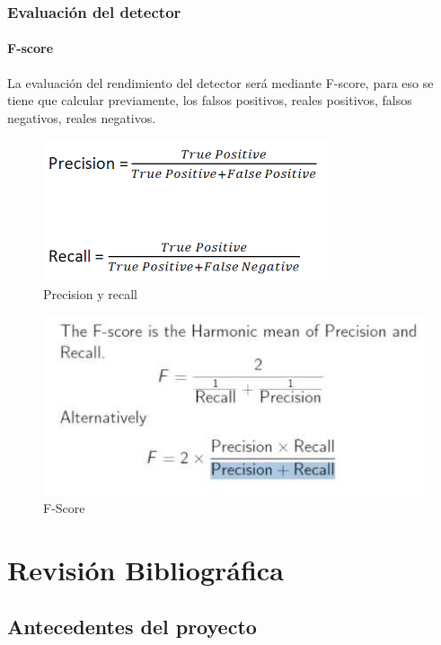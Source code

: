 \documentclass[a4paper,11pt]{report}
\begin{document}
\subsection{Evaluación del detector}
\subsubsection{F-score}
La evaluación del rendimiento del detector será mediante F-score, para eso se tiene que calcular previamente, los falsos positivos, reales positivos, falsos negativos, reales negativos.

\begin{figure}[h]
	\centering
	\includegraphics[scale=0.6]{Metodologia}
	\caption{Precision y recall}
	\label{fig:Precision y recall}
\end{figure}

\begin{figure}[h]
	\centering
	\includegraphics[scale=0.7]{Metodologia2}
	\caption{F-Score}
	\label{fig:F-Score }
\end{figure}



\chapter{Revisión Bibliográfica}



\section{Antecedentes del proyecto }
\end{document}
